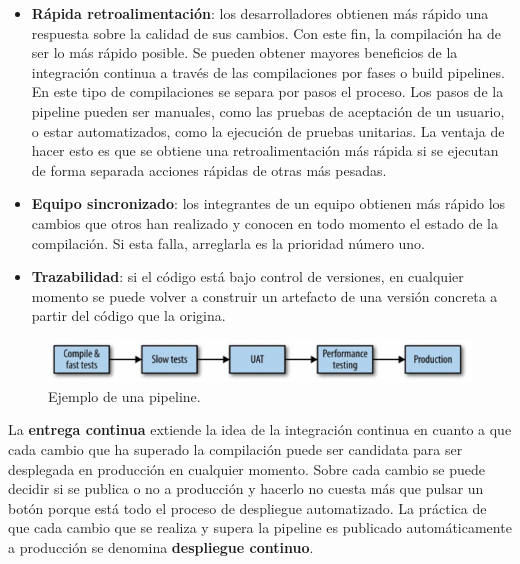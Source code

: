 \documentclass[11pt,spanish,listoffigures,listoftables]{tfgetsinf}
\begin{document}
\begin{itemize}

\item \textbf{Rápida retroalimentación}: los desarrolladores obtienen más rápido una respuesta sobre la calidad de sus cambios. Con este fin, la compilación ha de ser lo más rápido posible. Se pueden obtener mayores beneficios de la integración continua a través de las compilaciones por fases o build pipelines. En este tipo de compilaciones se separa por pasos el proceso. Los pasos de la pipeline pueden ser manuales, como las pruebas de aceptación de un usuario, o estar automatizados, como la ejecución de pruebas unitarias. La ventaja de hacer esto es que se obtiene una retroalimentación más rápida si se ejecutan de forma separada acciones rápidas de otras más pesadas. \cite{Fowler2006}

\item \textbf{Equipo sincronizado}: los integrantes de un equipo obtienen más rápido los cambios que otros han realizado y conocen en todo momento el estado de la compilación. Si esta falla, arreglarla es la prioridad número uno.

\item \textbf{Trazabilidad}: si el código está bajo control de versiones, en cualquier momento se puede volver a construir un artefacto de una versión concreta a partir del código que la origina. \cite{Newman2015a}

\end{itemize}

\begin{figure}[h]
\centering
\includegraphics[scale=1]{pipeline}
\caption{Ejemplo de una pipeline. \cite{Newman2015a}}
\end{figure}

La \textbf{entrega continua} extiende la idea de la integración continua en cuanto a que cada cambio que ha superado la compilación puede ser candidata para ser desplegada en producción en cualquier momento. Sobre cada cambio se puede decidir si se publica o no a producción y hacerlo no cuesta más que pulsar un botón porque está todo el proceso de despliegue automatizado. La práctica de que cada cambio que se realiza y supera la pipeline es publicado automáticamente a producción se denomina \textbf{despliegue continuo}. \cite{Fowler2013}
\end{document}

